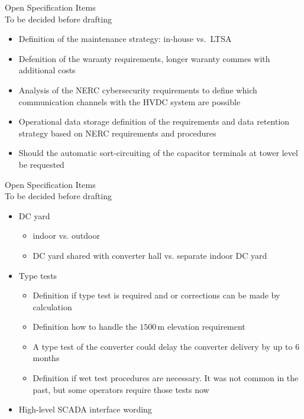 

\begin{frame}{Open Specification Items\\To be decided before drafting}
  \begin{itemize}
    \setlength{\itemsep}{0.4em}
    \item Definition of the maintenance strategy: in-house vs.\ LTSA
    \item Defenition of the waranty requirements, longer waranty commes with additional costs
    \item Analysis of the NERC cybersecurity requirements to define which communication channels with the HVDC system are possible
    \item Operational data storage definition of the requirements and data retention strategy based on NERC requirements and procedures
    \item Should the automatic sort-circuiting of the capacitor terminals at tower level be requested

  \end{itemize}
\end{frame}

\begin{frame}{Open Specification Items\\To be decided before drafting}
  \begin{itemize}
    \setlength{\itemsep}{0.4em}
    \item DC yard
      \begin{itemize}
        \item indoor vs. outdoor
        \item DC yard shared with converter hall vs. separate indoor DC yard
      \end{itemize}
    \item Type tests
      \begin{itemize}
        \item Definition if type test is required and or corrections can be made by calculation
        \item Definition how to handle the $1500\,\mathrm{m}$ elevation requirement
        \item A type test of the converter could delay the converter delivery by up to 6 months
        \item Definition if wet test procedures are necessary. It was not common in the past, but some operators require those tests now
      \end{itemize}
    \item High-level SCADA interface wording
  \end{itemize}
\end{frame}
